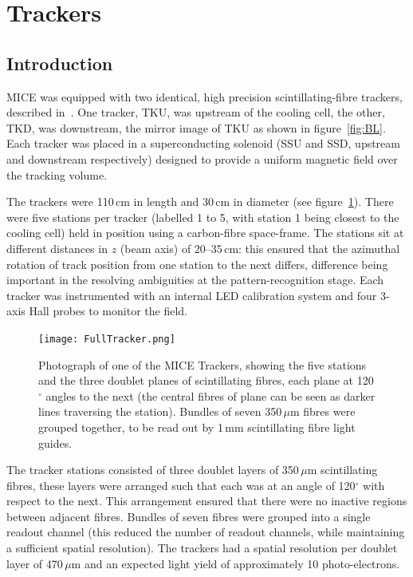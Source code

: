 \graphicspath{{06-Tracker/Figures/}}

\section{Trackers}
\label{Sect:Tracker}

\subsection{Introduction}
MICE was equipped with two identical, high precision scintillating-fibre trackers, described in~\cite{Ellis:2010bb}. One tracker, TKU, was upstream of the cooling cell, the other, TKD, was downstream, the mirror image of TKU as shown in figure~\ref{fig:BL}.
Each tracker was placed in a superconducting solenoid (SSU and SSD, upstream and downstream respectively) designed to provide a uniform magnetic field over the tracking volume. 


The trackers were 110\,cm in length and 30\,cm in diameter (see figure~\ref{Figure:FullTracker}). There were five stations per tracker (labelled 1 to 5, with station 1 being closest to the cooling cell) held in position using a carbon-fibre space-frame. The stations sit at different distances in $z$ (beam axis) of 20--35\,cm: this ensured that the azimuthal rotation of track position from one station to the next differs, difference being important in the resolving ambiguities at the pattern-recognition stage. Each tracker was instrumented with an internal LED calibration system and four 3-axis Hall probes to monitor the field.

\begin{figure}[ht]
\begin{center}
\texttt{[image: FullTracker.png]}
\end{center}
\caption{Photograph of one of the MICE Trackers, showing the five stations and the three doublet planes of scintillating fibres, each plane at 120$^\circ$ angles to the next (the central fibres of plane can be seen as darker lines traversing the station). Bundles of seven 350\,$\mu$m fibres were grouped together, to be read out by 1\,mm scintillating fibre light guides.}
\label{Figure:FullTracker}
\end{figure}

The tracker stations consisted of three doublet layers of 350\,$\mu$m scintillating fibres, these layers were arranged such that each was at an angle of 120$^\circ$ with respect to the next. This arrangement ensured that there were no inactive regions between adjacent fibres. Bundles of seven fibres were grouped into a single readout channel (this reduced the number of readout channels, while maintaining a sufficient spatial resolution). The trackers had a spatial resolution per doublet layer of 470\,$\mu$m and an expected light yield of approximately 10 photo-electrons.

